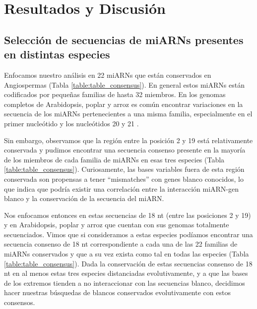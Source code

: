 \section{Resultados y Discusión}

\subsection{Selección de secuencias de miARNs presentes en distintas especies}

Enfocamos nuestro análisis en 22 miARNs que están conservados en Angiospermas \citep{citeulike:8816489,10.1371/journal.pgen.1002419} (Tabla \ref{table:table_consensus}).
En general estos miARNs están codificados por pequeñas familias de hasta 32 miembros.
En los genomas completos de Arabidopsis, poplar y arroz es común encontrar variaciones en la secuencia de los miARNs pertenecientes a una misma familia, especialmente en el primer nucleótido y los nucleótidos 20 y 21 \citep{10.1371/journal.pgen.1002419}.

Sin embargo, observamos que la región entre la posición 2 y 19 está relativamente conservada y pudimos encontrar una secuencia consenso presente en la mayoría de los miembros de cada familia de miARNs en esas tres especies (Tabla \ref{table:table_consensus}).
Curiosamente, las bases variables fuera de esta región conservada son propensas a tener ``mismatches'' con genes blanco conocidos, lo que indica que podría existir una correlación entre la interacción miARN-gen blanco y la conservación de la secuencia del miARN.

Nos enfocamos entonces en estas secuencias de 18 nt (entre las posiciones 2 y 19) y en Arabidopsis, poplar y arroz que cuentan con sus genomas totalmente secuenciados.
Vimos que si consideramos a estas especies podíamos encontrar una secuencia consenso de 18 nt correspondiente a cada una de las 22 familias de miARNs conservados y que a su vez exista como tal en todas las especies (Tabla \ref{table:table_consensus}).
Dada la conservación de estas secuencias consenso de 18 nt en al menos estas tres especies distanciadas evolutivamente, y a que las bases de los extremos tienden a no interaccionar con las secuencias blanco, decidimos hacer nuestras búsquedas de blancos conservados evolutivamente con estos consensos.


